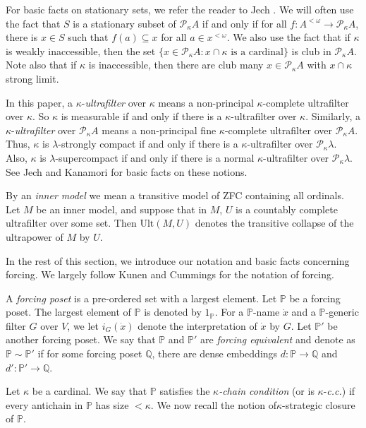 \documentclass[a4paper,12pt,reqno,oneside]{amsart}
\theoremstyle{plain}
\newcommand{\mrm}{\mathrm}
\newcommand{\mbb}{\mathbb}
\newcommand{\mcal}{\mathcal}
\begin{document}
For basic facts on stationary sets, we refer the reader to Jech \cite{J}. We will often use the fact that $S$ is a stationary subset of $\mcal{P}_\kappa A$ if and only if for all $f: A^{< \omega} \rightarrow \mcal{P}_\kappa A$, there is $x \in S$ such that $f(a) \subseteq x$ for all $a \in x^{< \omega}$. We also use the fact that if $\kappa$ is weakly inaccessible, then the set $\{ x \in \mcal{P}_\kappa A : \mbox{$x \cap \kappa$ is a cardinal} \}$ is club in $\mcal{P}_\kappa A$. Note also that if $\kappa$ is inaccessible, then there are club many $x \in \mcal{P}_\kappa A$ with $x \cap \kappa$ strong limit.

In this paper, a $\kappa$-\emph{ultrafilter} over $\kappa$ means a non-principal $\kappa$-complete ultrafilter over $\kappa$. So $\kappa$ is measurable if and only if there is a $\kappa$-ultrafilter over $\kappa$. Similarly, a $\kappa$-\emph{ultrafilter} over $\mcal{P}_\kappa A$ means a non-principal fine $\kappa$-complete ultrafilter over $\mcal{P}_\kappa A$. Thus, $\kappa$ is $\lambda$-strongly compact if and only if there is a $\kappa$-ultrafilter over $\mcal{P}_\kappa \lambda$. Also, $\kappa$ is $\lambda$-supercompact if and only if there is a normal $\kappa$-ultrafilter over $\mcal{P}_\kappa \lambda$. See Jech \cite{Je} and Kanamori \cite{K} for basic facts on these notions.

By an \emph{inner model} we mean a transitive model of ZFC containing all ordinals. Let $M$ be an inner model, and suppose that in $M$, $U$ is a countably complete ultrafilter over some set. Then $\mrm{Ult} ( M , U )$ denotes the transitive collapse of the ultrapower of $M$ by $U$.

In the rest of this section, we introduce our notation and basic facts concerning forcing. We largely follow Kunen \cite{Ku} and Cummings \cite{C} for the notation of forcing.

A \emph{forcing poset} is a pre-ordered set with a largest element. Let $\mbb{P}$ be a forcing poset. The largest element of $\mbb{P}$ is denoted by $1_\mbb{P}$. For a $\mbb{P}$-name $\dot{x}$ and a $\mbb{P}$-generic filter $G$ over $V$, we let $i_G ( \dot{x} )$ denote the interpretation of $\dot{x}$ by $G$. Let $\mbb{P}'$ be another forcing poset. We say that $\mbb{P}$ and $\mbb{P}'$ are \emph{forcing equivalent} and denote as $\mbb{P} \sim \mbb{P}'$ if for some forcing poset $\mbb{Q}$, there are dense embeddings $d : \mbb{P} \to \mbb{Q}$ and $d' : \mbb{P}' \to \mbb{Q}$.

Let $\kappa$ be a cardinal. We say that $\mbb{P}$ satisfies the \emph{$\kappa$-chain condition} (or is $\kappa$-\emph{c.c.}) if every antichain in $\mbb{P}$ has size $< \kappa$. We now recall the notion of$\kappa$-strategic closure of $\mbb{P}$.
\end{document}
